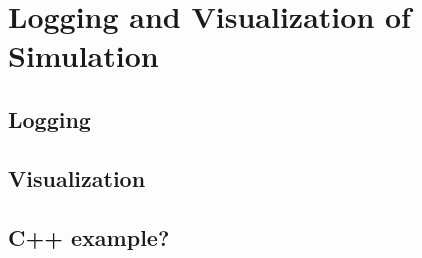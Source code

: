 \chapter{Logging and Visualization of Simulation}

\section{Logging}

\section{Visualization}

\section{C++ example?}



